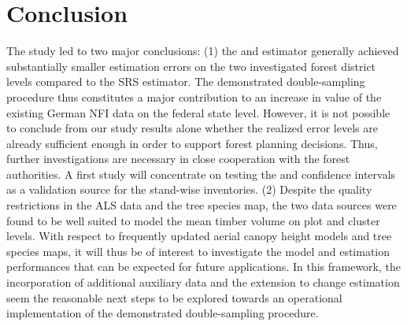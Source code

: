 \section{Conclusion}
\label{sec:concl}

The study led to two major conclusions: (1) the \extpsynth{} and \psmall{} estimator generally achieved substantially smaller estimation errors on the two investigated forest district levels compared to the SRS estimator. The demonstrated double-sampling procedure thus constitutes a major contribution to an increase in value of the existing German NFI data on the federal state level. However, it is not possible to conclude from our study results alone whether the realized error levels are already sufficient enough in order to support forest planning decisions. Thus, further investigations are necessary in close cooperation with the forest authorities. A first study will concentrate on testing the \extpsynth{} and \psmall{} confidence intervals as a validation source for the stand-wise inventories. (2) Despite the quality restrictions in the ALS data and the tree species map, the two data sources were found to be well suited to model the mean timber volume on plot and cluster levels. With respect to frequently updated aerial canopy height models and tree species maps, it will thus be of interest to investigate the model and estimation performances that can be expected for future applications. In this framework, the incorporation of additional auxiliary data and the extension to change estimation seem the reasonable next steps to be explored towards an operational implementation of the demonstrated double-sampling procedure.